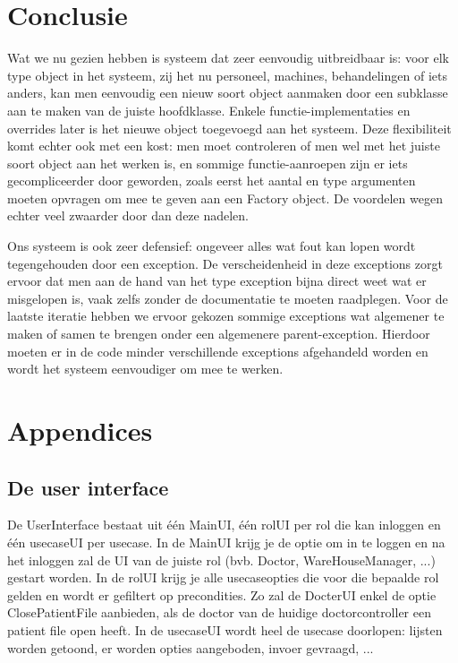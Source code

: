 \documentclass[a4paper]{article}
\begin{document}
\section{Conclusie}
Wat we nu gezien hebben is systeem dat zeer eenvoudig uitbreidbaar is: voor elk type object in het systeem, zij het nu personeel, machines, behandelingen of iets anders, kan men eenvoudig een nieuw soort object aanmaken door een subklasse aan te maken van de juiste hoofdklasse. Enkele functie-implementaties en overrides later is het nieuwe object toegevoegd aan het systeem.
Deze flexibiliteit komt echter ook met een kost: men moet controleren of men wel met het juiste soort object aan het werken is, en sommige functie-aanroepen zijn er iets gecompliceerder door geworden, zoals eerst het aantal en type argumenten moeten opvragen om mee te geven aan een Factory object. De voordelen wegen echter veel zwaarder door dan deze nadelen.

Ons systeem is ook zeer defensief: ongeveer alles wat fout kan lopen wordt tegengehouden door een exception. De verscheidenheid in deze exceptions zorgt ervoor dat men aan de hand van het type exception bijna direct weet wat er misgelopen is, vaak zelfs zonder de documentatie te moeten raadplegen.
Voor de laatste iteratie hebben we ervoor gekozen sommige exceptions wat algemener te maken of samen te brengen onder een algemenere parent-exception. Hierdoor moeten er in de code minder verschillende exceptions afgehandeld worden en wordt het systeem eenvoudiger om mee te werken.


\section{Appendices}
\subsection{De user interface \label{sec:ui}}
De UserInterface bestaat uit \'e\'en MainUI, \'e\'en rolUI per rol die kan inloggen en \'e\'en usecaseUI per usecase.
In de MainUI krijg je de optie om in te loggen en na het inloggen zal de UI van de juiste rol (bvb. Doctor, WareHouseManager, ...) gestart worden.
In de rolUI krijg je alle usecaseopties die voor die bepaalde rol gelden en wordt er gefiltert op precondities. Zo zal de DocterUI enkel de optie ClosePatientFile aanbieden, als de doctor van de huidige doctorcontroller een patient file open heeft.
In de usecaseUI wordt heel de usecase doorlopen: lijsten worden getoond, er worden opties aangeboden, invoer gevraagd, ...
\end{document}
